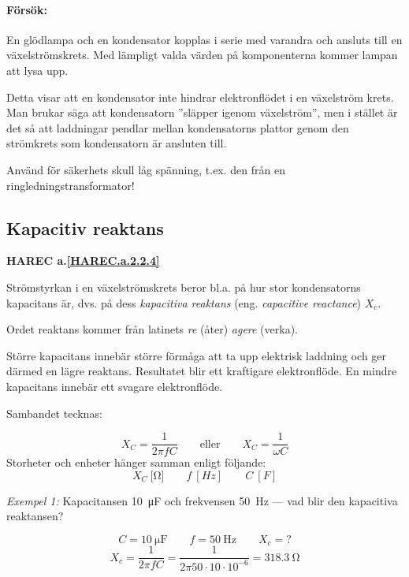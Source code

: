 
\paragraph{Försök:}

En glödlampa och en kondensator kopplas i serie med varandra och ansluts till en
växelströmskrets. Med lämpligt valda värden på komponenterna kommer lampan att
lysa upp.

Detta visar att en kondensator inte hindrar elektronflödet i en växelström
krets. Man brukar säga att kondensatorn ''släpper igenom växelström'', men i
stället är det så att laddningar pendlar mellan kondensatorns plattor genom den
strömkrets som kondensatorn är ansluten till.

Använd för säkerhets skull låg spänning, t.ex. den från en
ringledningstransformator!

\subsection{Kapacitiv reaktans}
\textbf{HAREC a.\ref{HAREC.a.2.2.4}\label{myHAREC.a.2.2.4}}

Strömstyrkan i en växelströmskrets beror bl.a. på hur stor kondensatorns
kapacitans är, dvs. på dess \emph{kapacitiva reaktans} (eng.
\emph{capacitive reactance}) \(X_c\).

Ordet reaktans kommer från latinets \emph{re} (åter) \emph{agere} (verka).

Större kapacitans innebär större förmåga att ta upp elektrisk laddning och ger
därmed en lägre reaktans. Resultatet blir ett kraftigare elektronflöde.
En mindre kapacitans innebär ett svagare elektronflöde.

Sambandet tecknas:

\[
X_C = \frac{1}{2\pi fC} \qquad \mathrm{eller} \qquad X_C = \dfrac{1}{\omega C}
\]
Storheter och enheter hänger samman enligt följande:
\[
	X_C\ \unit{[\ohm]} \qquad 
	f\ \unit{[Hz]} \qquad 
	C\ \unit{[F]}
\]


\noindent\emph{Exempel 1:} Kapacitansen \SI{10}{\micro\farad} och frekvensen \SI{50}{Hz} --- vad blir den kapacitiva reaktansen?

\[ C = \SI{10}{\micro\farad} \qquad f = \SI{50}{\hertz} \qquad X_c = ? \]
\[
X_c = \frac{1}{2 \pi f C} = 
\frac{1}{2\pi 50 \cdot 10 \cdot 10^{-6}} = 
\SI{318,3}{\ohm}
\]

